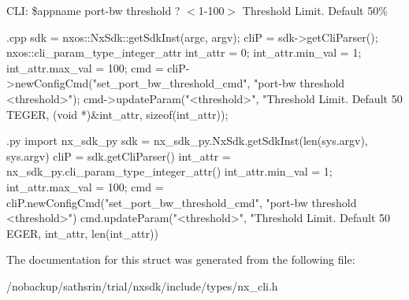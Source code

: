 CLI: \$appname port-\/bw threshold ? $<$1-\/100$>$ Threshold Limit. Default 50\%


\begin{DoxyCode}
 {.cpp}
       sdk = nxos::NxSdk::getSdkInst(argc, argv);
       cliP = sdk->getCliParser();
       nxos::cli_param_type_integer_attr int_attr = {0};
       int_attr.min_val = 1;
       int_attr.max_val = 100;
       cmd = cliP->newConfigCmd("set_port_bw_threshold_cmd",
                                "port-bw threshold <threshold>");
       cmd->updateParam("<threshold>", "Threshold Limit. Default 50%
      TEGER,
                        (void *)&int_attr, sizeof(int_attr));
\end{DoxyCode}



\begin{DoxyCode}
 {.py}
       import nx_sdk_py
       sdk = nx_sdk_py.NxSdk.getSdkInst(len(sys.argv), sys.argv)
       cliP = sdk.getCliParser()
       int_attr = nx_sdk_py.cli_param_type_integer_attr()
       int_attr.min_val = 1;
       int_attr.max_val = 100;
       cmd = cliP.newConfigCmd("set_port_bw_threshold_cmd", 
                               "port-bw threshold <threshold>")
       cmd.updateParam("<threshold>", "Threshold Limit. Default 50%
      EGER,
                       int_attr, len(int_attr))
\end{DoxyCode}
 

The documentation for this struct was generated from the following file:\begin{DoxyCompactItemize}
\item 
/nobackup/sathsrin/trial/nxsdk/include/types/nx\_\-cli.h\end{DoxyCompactItemize}
